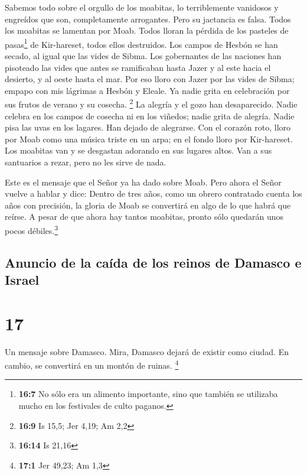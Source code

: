  Sabemos todo sobre el orgullo de los moabitas, lo
terriblemente vanidosos y engreídos que son, completamente arrogantes.
Pero su jactancia es falsa.  Todos los moabitas se
lamentan por Moab. Todos lloran la pérdida de los pasteles de
pasas\footnote{\textbf{16:7} No sólo era un alimento importante, sino
  que también se utilizaba mucho en los festivales de culto paganos.} de
Kir-hareset, todos ellos destruidos.  Los campos de Hesbón
se han secado, al igual que las vides de Sibma. Los gobernantes de las
naciones han pisoteado las vides que antes se ramificaban hasta Jazer y
al este hacia el desierto, y al oeste hasta el mar.  Por
eso lloro con Jazer por las vides de Sibma; empapo con mis lágrimas a
Hesbón y Eleale. Ya nadie grita en celebración por sus frutos de verano
y su cosecha. \footnote{\textbf{16:9} Is 15,5; Jer 4,19; Am 2,2}
 La alegría y el gozo han desaparecido. Nadie celebra en
los campos de cosecha ni en los viñedos; nadie grita de alegría. Nadie
pisa las uvas en los lagares. Han dejado de alegrarse. 
Con el corazón roto, lloro por Moab como una música triste en un arpa;
en el fondo lloro por Kir-hareset.  Los moabitas van y se
desgastan adorando en sus lugares altos. Van a sus santuarios a rezar,
pero no les sirve de nada.

 Este es el mensaje que el Señor ya ha dado sobre Moab.
 Pero ahora el Señor vuelve a hablar y dice: Dentro de
tres años, como un obrero contratado cuenta los años con precisión, la
gloria de Moab se convertirá en algo de lo que habrá que reírse. A pesar
de que ahora hay tantos moabitas, pronto sólo quedarán unos pocos
débiles.\footnote{\textbf{16:14} Is 21,16}

\hypertarget{anuncio-de-la-cauxedda-de-los-reinos-de-damasco-e-israel}{%
\subsection{Anuncio de la caída de los reinos de Damasco e
Israel}\label{anuncio-de-la-cauxedda-de-los-reinos-de-damasco-e-israel}}

\hypertarget{section-16}{%
\section{17}\label{section-16}}

 Un mensaje sobre Damasco. Mira, Damasco dejará de existir
como ciudad. En cambio, se convertirá en un montón de ruinas.
\footnote{\textbf{17:1} Jer 49,23; Am 1,3}

